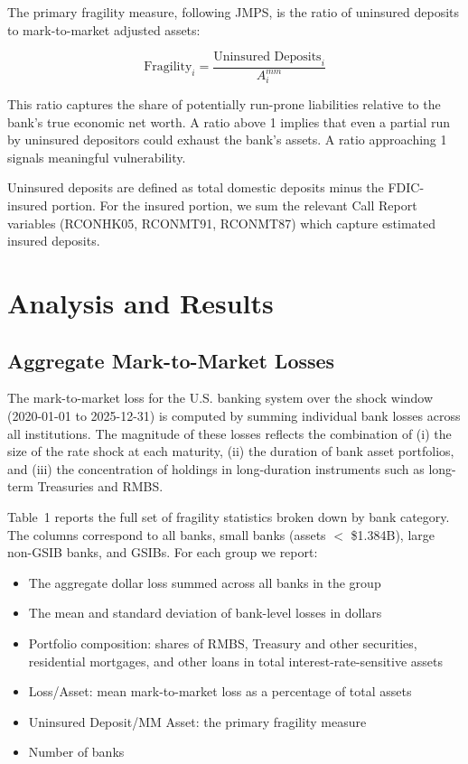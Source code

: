 \documentclass[12pt, a4paper]{article}
\begin{document}
The primary fragility measure, following JMPS, is the ratio of uninsured deposits
to mark-to-market adjusted assets:

\[
    \text{Fragility}_i = \frac{\text{Uninsured Deposits}_i}{A^{mm}_i}
\]

This ratio captures the share of potentially run-prone liabilities relative to the
bank's true economic net worth. A ratio above 1 implies that even a partial run
by uninsured depositors could exhaust the bank's assets. A ratio approaching 1
signals meaningful vulnerability.

Uninsured deposits are defined as total domestic deposits minus the FDIC-insured
portion. For the insured portion, we sum the relevant Call Report variables
(RCONHK05, RCONMT91, RCONMT87) which capture estimated insured deposits.

\section{Analysis and Results}
\label{sec:analysis}

\subsection{Aggregate Mark-to-Market Losses}

The mark-to-market loss for the U.S. banking system over the shock window
(2020-01-01 to 2025-12-31) is computed by
summing individual bank losses across all institutions. The magnitude of these
losses reflects the combination of (i) the size of the rate shock at each maturity,
(ii) the duration of bank asset portfolios, and (iii) the concentration of holdings
in long-duration instruments such as long-term Treasuries and RMBS.

Table~1 reports the full set of fragility statistics broken down by bank category.
The columns correspond to all banks, small banks (assets $<$ \$1.384B), large
non-GSIB banks, and GSIBs. For each group we report:

\begin{itemize}[noitemsep]
    \item The aggregate dollar loss summed across all banks in the group
    \item The mean and standard deviation of bank-level losses in dollars
    \item Portfolio composition: shares of RMBS, Treasury and other securities,
    residential mortgages, and other loans in total interest-rate-sensitive assets
    \item Loss/Asset: mean mark-to-market loss as a percentage of total assets
    \item Uninsured Deposit/MM Asset: the primary fragility measure
    \item Number of banks
\end{itemize}
\end{document}
